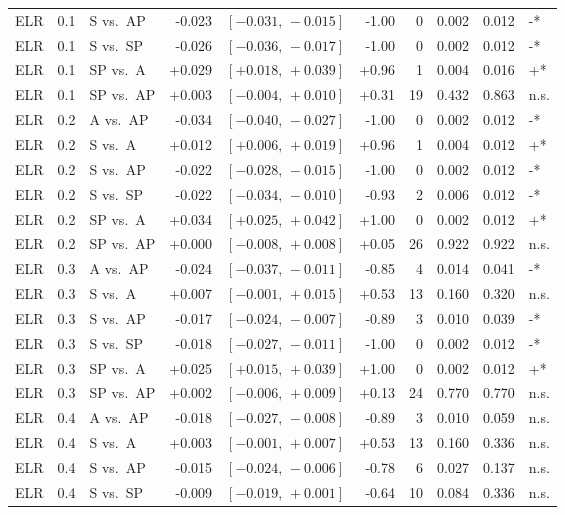 \begin{landscape}
\begin{scriptsize}
\begin{longtable}{lllrrrrrrl}
ELR & 0.1 & S vs.\ AP & -0.023 & $[-0.031,\,-0.015]$ & -1.00 & 0 & 0.002 & 0.012 & -* \\
ELR & 0.1 & S vs.\ SP & -0.026 & $[-0.036,\,-0.017]$ & -1.00 & 0 & 0.002 & 0.012 & -* \\
ELR & 0.1 & SP vs.\ A & +0.029 & $[+0.018,\,+0.039]$ & +0.96 & 1 & 0.004 & 0.016 & +* \\
ELR & 0.1 & SP vs.\ AP & +0.003 & $[-0.004,\,+0.010]$ & +0.31 & 19 & 0.432 & 0.863 & n.s. \\
ELR & 0.2 & A vs.\ AP & -0.034 & $[-0.040,\,-0.027]$ & -1.00 & 0 & 0.002 & 0.012 & -* \\
ELR & 0.2 & S vs.\ A & +0.012 & $[+0.006,\,+0.019]$ & +0.96 & 1 & 0.004 & 0.012 & +* \\
ELR & 0.2 & S vs.\ AP & -0.022 & $[-0.028,\,-0.015]$ & -1.00 & 0 & 0.002 & 0.012 & -* \\
ELR & 0.2 & S vs.\ SP & -0.022 & $[-0.034,\,-0.010]$ & -0.93 & 2 & 0.006 & 0.012 & -* \\
ELR & 0.2 & SP vs.\ A & +0.034 & $[+0.025,\,+0.042]$ & +1.00 & 0 & 0.002 & 0.012 & +* \\
ELR & 0.2 & SP vs.\ AP & +0.000 & $[-0.008,\,+0.008]$ & +0.05 & 26 & 0.922 & 0.922 & n.s. \\
ELR & 0.3 & A vs.\ AP & -0.024 & $[-0.037,\,-0.011]$ & -0.85 & 4 & 0.014 & 0.041 & -* \\
ELR & 0.3 & S vs.\ A & +0.007 & $[-0.001,\,+0.015]$ & +0.53 & 13 & 0.160 & 0.320 & n.s. \\
ELR & 0.3 & S vs.\ AP & -0.017 & $[-0.024,\,-0.007]$ & -0.89 & 3 & 0.010 & 0.039 & -* \\
ELR & 0.3 & S vs.\ SP & -0.018 & $[-0.027,\,-0.011]$ & -1.00 & 0 & 0.002 & 0.012 & -* \\
ELR & 0.3 & SP vs.\ A & +0.025 & $[+0.015,\,+0.039]$ & +1.00 & 0 & 0.002 & 0.012 & +* \\
ELR & 0.3 & SP vs.\ AP & +0.002 & $[-0.006,\,+0.009]$ & +0.13 & 24 & 0.770 & 0.770 & n.s. \\
ELR & 0.4 & A vs.\ AP & -0.018 & $[-0.027,\,-0.008]$ & -0.89 & 3 & 0.010 & 0.059 & n.s. \\
ELR & 0.4 & S vs.\ A & +0.003 & $[-0.001,\,+0.007]$ & +0.53 & 13 & 0.160 & 0.336 & n.s. \\
ELR & 0.4 & S vs.\ AP & -0.015 & $[-0.024,\,-0.006]$ & -0.78 & 6 & 0.027 & 0.137 & n.s. \\
ELR & 0.4 & S vs.\ SP & -0.009 & $[-0.019,\,+0.001]$ & -0.64 & 10 & 0.084 & 0.336 & n.s. \\

\end{longtable}
\end{scriptsize}
\end{landscape}
